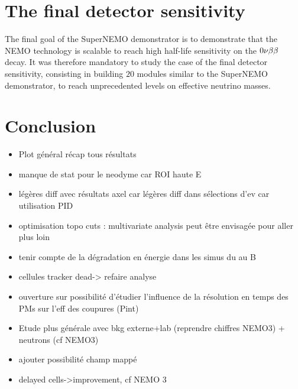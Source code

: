 \section{The final detector sensitivity}

The final goal of the SuperNEMO demonstrator is to demonstrate that the NEMO technology is scalable to reach high half-life sensitivity on the $0\nu\beta\beta$ decay.
It was therefore mandatory to study the case of the final detector sensitivity, consisting in building $20$ modules similar to the SuperNEMO demonstrator, to reach unprecedented levels on effective neutrino masses.



\section{Conclusion}
\begin{itemize}
\item Plot général récap tous résultats

\item manque de stat pour le neodyme car ROI haute E
\item légères diff avec résultats axel car légères diff dans sélections d'ev car utilisation PID

\item optimisation topo cuts : multivariate analysis peut être envisagée pour aller plus loin
\item tenir compte de la dégradation en énergie dans les simus du au B
\item cellules tracker dead-> refaire analyse
\item ouverture sur possibilité d'étudier l'influence de la résolution en temps des PMs sur l'eff des coupures (Pint)
\item Etude plus générale avec bkg externe+lab (reprendre chiffres NEMO3) + neutrons (cf NEMO3)
\item ajouter possibilité champ mappé
\item delayed cells->improvement, cf NEMO 3
\end{itemize}
